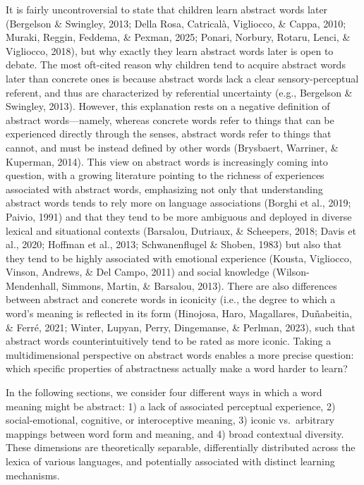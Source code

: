 \documentclass[
  man,floatsintext]{apa6}
\begin{document}
It is fairly uncontroversial to state that children learn abstract words later (Bergelson \& Swingley, 2013; Della Rosa, Catricalà, Vigliocco, \& Cappa, 2010; Muraki, Reggin, Feddema, \& Pexman, 2025; Ponari, Norbury, Rotaru, Lenci, \& Vigliocco, 2018), but why exactly they learn abstract words later is open to debate. The most oft-cited reason why children tend to acquire abstract words later than concrete ones is because abstract words lack a clear sensory-perceptual referent, and thus are characterized by referential uncertainty (e.g., Bergelson \& Swingley, 2013). However, this explanation rests on a negative definition of abstract words---namely, whereas concrete words refer to things that can be experienced directly through the senses, abstract words refer to things that cannot, and must be instead defined by other words (Brysbaert, Warriner, \& Kuperman, 2014). This view on abstract words is increasingly coming into question, with a growing literature pointing to the richness of experiences associated with abstract words, emphasizing not only that understanding abstract words tends to rely more on language associations (Borghi et al., 2019; Paivio, 1991) and that they tend to be more ambiguous and deployed in diverse lexical and situational contexts (Barsalou, Dutriaux, \& Scheepers, 2018; Davis et al., 2020; Hoffman et al., 2013; Schwanenflugel \& Shoben, 1983) but also that they tend to be highly associated with emotional experience (Kousta, Vigliocco, Vinson, Andrews, \& Del Campo, 2011) and social knowledge (Wilson-Mendenhall, Simmons, Martin, \& Barsalou, 2013). There are also differences between abstract and concrete words in iconicity (i.e., the degree to which a word's meaning is reflected in its form (Hinojosa, Haro, Magallares, Duñabeitia, \& Ferré, 2021; Winter, Lupyan, Perry, Dingemanse, \& Perlman, 2023), such that abstract words counterintuitively tend to be rated as more iconic. Taking a multidimensional perspective on abstract words enables a more precise question: which specific properties of abstractness actually make a word harder to learn?

In the following sections, we consider four different ways in which a word meaning might be abstract: 1) a lack of associated perceptual experience, 2) social-emotional, cognitive, or interoceptive meaning, 3) iconic vs.~arbitrary mappings between word form and meaning, and 4) broad contextual diversity. These dimensions are theoretically separable, differentially distributed across the lexica of various languages, and potentially associated with distinct learning mechanisms.
\end{document}
